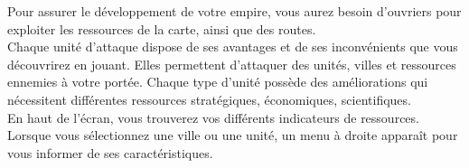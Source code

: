 \documentclass[a5paper, 10pt, twoside]{article}
\begin{document}
Pour assurer le développement de votre empire, vous aurez besoin d'ouvriers
pour exploiter les ressources de la carte, ainsi que des routes.\\

Chaque unité d'attaque dispose de ses avantages et de ses inconvénients que
vous découvrirez en jouant. Elles permettent d'attaquer des unités, villes et
ressources ennemies à votre portée. Chaque type d'unité possède des
améliorations qui nécessitent différentes ressources stratégiques, économiques,
scientifiques.\\

En haut de l'écran, vous trouverez vos différents indicateurs de ressources.
Lorsque vous sélectionnez une ville ou une unité, un menu à droite apparaît
pour vous informer de ses caractéristiques.\\
\end{document}
